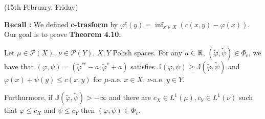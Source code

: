 \documentclass[12pt,a4paper]{article}
\begin{document}
(15th February, Friday)
\s

\textbf{Recall :} We defined \textbf{c-trasform} by $\varphi^c(y) = \inf_{x\in X} (c(x,y) - \varphi(x))$. Our goal is to prove \textbf{Theorem 4.10.}
\s

 Let $\mu \in \mathscr{P}(X)$, $\nu \in \mathscr{P}(Y)$, $X, Y$ Polish spaces. For any $a\in \mathbb{R}$, $(\tilde{\varphi}, \tilde{\psi}) \in \Phi_c$, we have that $(\varphi, \psi) = (\tilde{\varphi}^{cc} - a, \tilde{\varphi}^c + a)$ satisfies $\mathbb{J}(\varphi, \psi) \geq \mathbb{J}(\tilde{\varphi}, \tilde{\psi})$ and $\varphi(x) + \psi(y) \leq c(x,y)$ for $\mu$-a.e. $x\in X$, $\nu$-a.e. $y\in Y$.

\quad Furthurmore, if $\mathbb{J}(\tilde{\varphi}, \tilde{\psi}) > -\infty$ and there are $c_X\in L^1(\mu), c_Y \in L^1(\nu)$ such that $\varphi \leq c_X$ and $\psi \leq c_Y$ then $(\varphi, \psi) \in \Phi_c$.
\end{document}
